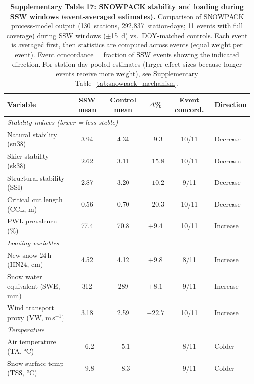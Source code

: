 \documentclass[11pt,letterpaper]{article}
\begin{document}
\begin{table}[!ht]
\centering
\caption{\textbf{Supplementary Table 17: SNOWPACK stability and loading during SSW windows (event-averaged estimates).}
Comparison of SNOWPACK process-model output (130~stations, 292,837~station-days; 11 events with full coverage) during SSW windows ($\pm$15~d) vs.\ DOY-matched controls. Each event is averaged first, then statistics are computed across events (equal weight per event). Event concordance = fraction of SSW events showing the indicated direction. For station-day pooled estimates (larger effect sizes because longer events receive more weight), see Supplementary Table~\ref{tab:snowpack_mechanism}.}
\label{tab:snowpack}
\small
\begin{tabular}{lccccl}
\toprule
Variable & SSW mean & Control mean & $\Delta$\% & Event concord. & Direction \\
\midrule
\multicolumn{6}{l}{\textit{Stability indices (lower = less stable)}} \\
Natural stability (sn38) & 3.94 & 4.34 & $-9.3$ & 10/11 & Decrease \\
Skier stability (sk38) & 2.62 & 3.11 & $-15.8$ & 10/11 & Decrease \\
Structural stability (SSI) & 2.87 & 3.20 & $-10.2$ & 9/11 & Decrease \\
Critical cut length (CCL, m) & 0.56 & 0.70 & $-20.3$ & 10/11 & Decrease \\
PWL prevalence (\%) & 77.4 & 70.8 & $+9.4$ & 10/11 & Increase \\
\midrule
\multicolumn{6}{l}{\textit{Loading variables}} \\
New snow 24\,h (HN24, cm) & 4.52 & 4.12 & $+9.8$ & 8/11 & Increase \\
Snow water equivalent (SWE, mm) & 312 & 289 & $+8.1$ & 9/11 & Increase \\
Wind transport proxy (VW, m\,s$^{-1}$) & 3.18 & 2.59 & $+22.7$ & 10/11 & Increase \\
\midrule
\multicolumn{6}{l}{\textit{Temperature}} \\
Air temperature (TA, °C) & $-6.2$ & $-5.1$ & --- & 8/11 & Colder \\
Snow surface temp (TSS, °C) & $-9.8$ & $-8.3$ & --- & 9/11 & Colder \\
\bottomrule
\end{tabular}
\end{table}
\end{document}
